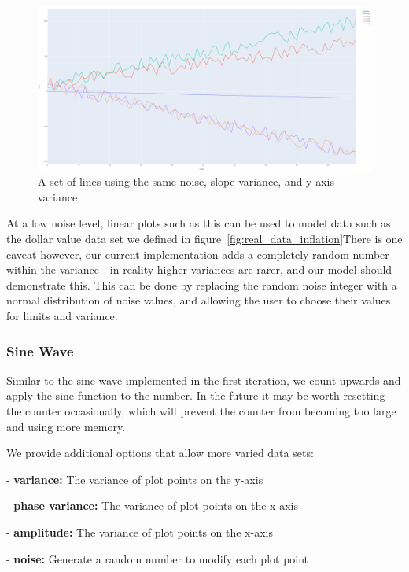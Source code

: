 \begin{figure}[H]
    \centering
    \includegraphics[width=12cm]{figures/data_generation/fake_data_linear_plot}
    \caption{A set of lines using the same noise, slope variance, and y-axis variance}
    \label{fig:datagen_fig_2}
\end{figure}

At a low noise level, linear plots such as this can be used to model data such as the dollar value data set we defined
in figure~\ref{fig:real_data_inflation}\.
There is one caveat however, our current implementation adds a completely random number within the variance - in reality
higher variances are rarer, and our model should demonstrate this.
This can be done by replacing the random noise integer with a normal distribution of noise values, and allowing the user
to choose their values for limits and variance.

\subsubsection{Sine Wave}

Similar to the sine wave implemented in the first iteration, we count upwards and apply the sine function to the number.
In the future it may be worth resetting the counter occasionally, which will prevent the counter from becoming too large
and using more memory.

We provide additional options that allow more varied data sets:

- \textbf{variance:} The variance of plot points on the y-axis

- \textbf{phase variance:} The variance of plot points on the x-axis

- \textbf{amplitude:} The variance of plot points on the x-axis

- \textbf{noise:} Generate a random number to modify each plot point


